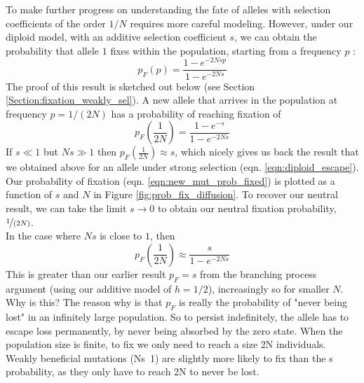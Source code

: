 {To make further progress on understanding the fate of alleles with
selection coefficients of the order $1/N$ requires more careful
modeling. However, under our diploid model, with an additive selection coefficient $s$, we can obtain the probability that allele $1$ fixes within the population, starting
from a frequency $p$ :
\begin{equation}
p_F(p) = \frac{1-e^{-2Ns p }}{1-e^{-2Ns}} \label{eqn:prob_fixed}
\end{equation}
The proof of this result is sketched out below (see Section \ref{Section:fixation_weakly_sel}). A new allele that arrives in the population at frequency $p=1/(2N)$ has a probability of reaching fixation of
\begin{equation}
p_F \left(\frac{1}{2N} \right) = \frac{1-e^{-s }}{1-e^{-2Ns}} \label{eqn:new_mut_prob_fixed}
\end{equation}
If $s \ll1$ but $Ns \gg 1$ then $p_F(\frac{1}{2N}) \approx s$, which
nicely gives
us back the result that we obtained above for an allele under strong selection
(eqn. \eqref{eqn:diploid_escape}). Our probability of fixation
(eqn. \eqref{eqn:new_mut_prob_fixed}) is plotted as a function of $s$
and $N$ in Figure \ref{fig:prob_fix_diffusion}. To recover our neutral
result, we can take the
limit $s \rightarrow 0$ to obtain our neutral fixation
probability, $\nicefrac{1}{(2N)}$. \\

In the case where $Ns$ is close to $1$, then
\begin{equation}
p_F \left( \frac{1}{2N} \right) \approx \frac{s}{1-e^{-2Ns}} \label{eqn:escape_from_intro}
\end{equation}
This is greater than our earlier result $p_F=s$ from the branching process
argument (using our additive model of $h=1/2$), increasingly so for smaller $N$. 
Why is this?  The reason why is that $p_F$ is really the probability
of "never being lost" in an infinitely large population. So to persist
indefinitely, the allele has to escape loss permanently, by never being
absorbed by the zero state. When the population size is finite, to fix
we only need to reach a size 2N individuals. Weakly beneficial
mutations (Ns~1) are slightly more likely to fix than the s
probability, as they only have to reach 2N to never be lost.

}
